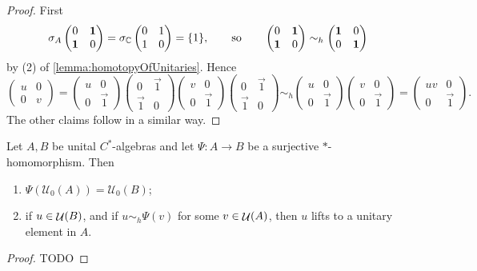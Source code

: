 \begin{proof}
First
\[ \sigma_A \begin{pmatrix}
0 & \bm{\mathrm{1}} \\ \bm{\mathrm{1}} & 0
\end{pmatrix} = \sigma_{\mathbb{C}} \begin{pmatrix}
0 & 1 \\ 1 & 0
\end{pmatrix} = \{1\}, \qquad \text{so} \qquad \begin{pmatrix}
0 & \bm{\mathrm{1}} \\ \bm{\mathrm{1}} & 0
\end{pmatrix} \sim_h \begin{pmatrix}
\bm{\mathrm{1}} & 0 \\ 0 & \bm{\mathrm{1}}
\end{pmatrix} \]
by (2) of \ref{lemma:homotopyOfUnitaries}.
Hence
\[ \begin{pmatrix}
u & 0 \\ 0 & v
\end{pmatrix} = \begin{pmatrix}
u & 0 \\ 0 & \vec{1}
\end{pmatrix}\begin{pmatrix}
0 & \vec{1} \\ \vec{1} & 0
\end{pmatrix}\begin{pmatrix}
v & 0 \\ 0 & \vec{1}
\end{pmatrix}\begin{pmatrix}
0 & \vec{1} \\ \vec{1} & 0
\end{pmatrix} \sim_h \begin{pmatrix}
u & 0 \\ 0 & \vec{1}
\end{pmatrix}\begin{pmatrix}
v & 0 \\ 0 & \vec{1}
\end{pmatrix} = \begin{pmatrix}
uv & 0 \\ 0 & \vec{1}
\end{pmatrix}.
 \]
 The other claims follow in a similar way.
\end{proof}

\begin{lemma} \label{lemma:unitaryLifting}
Let $A,B$ be unital $C^*$-algebras and let $\Psi: A \to B$ be a surjective $*$-homomorphism. Then
\begin{enumerate}
\item $\Psi\left(\mathcal{U}_0(A)\right) = \mathcal{U}_0(B)$;
\item if $u\in\mathop{\mathcal{U}}\nolimits(B)$, and if $u \sim_h \Psi(v)$ for some $v\in\mathop{\mathcal{U}}\nolimits(A)$, then $u$ lifts to a unitary element in $A$.
\end{enumerate}
\end{lemma}
\begin{proof}
TODO
\end{proof}

